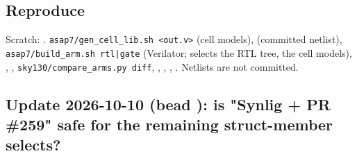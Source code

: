 \subsection{Reproduce}\label{cr:defect:asap7-cpu-synlig-ma7:reproduce}

\begin{record}

Scratch: .
\texttt{asap7/\allowbreak{}gen\_\allowbreak{}cell\_\allowbreak{}lib.\allowbreak{}sh\ <out.\allowbreak{}v>}
(cell models),  (committed netlist),
\texttt{asap7/\allowbreak{}build\_\allowbreak{}arm.\allowbreak{}sh\ rtl|gate}
(Verilator;  selects the RTL tree,  the
cell models), , ,
\texttt{sky130/\allowbreak{}compare\_\allowbreak{}arms.\allowbreak{}py\ diff},
, ,
, . Netlists
are not committed.

\end{record}

\subsection{\texorpdfstring{Update 2026-10-10 (bead ): is
"Synlig + PR \#259" safe for the remaining struct-member
selects?}{Update 2026-10-10 (bead ): is "Synlig + PR \#259" safe for the remaining struct-member selects?}}\label{cr:defect:asap7-cpu-synlig-ma7:update-2026-10-10-bead-ainf-is-synlig-pr-259-safe-for-the-remaining-struct-member-selects}

